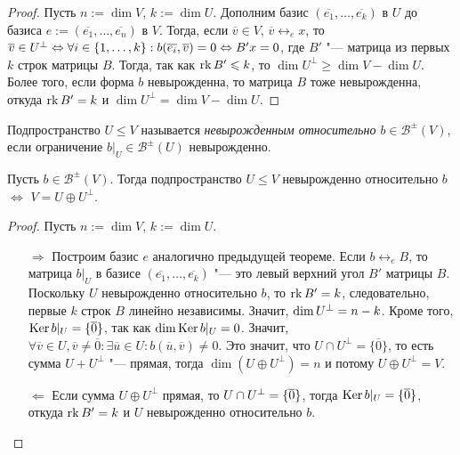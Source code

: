 \begin{proof}
	Пусть $n := \dim{V}$, $k := \dim{U}$. Дополним базис $(\overline{e_1}, \dots, \overline{e_k})$ в $U$ до базиса $e := (\overline{e_1}, \dots, \overline{e_n})$ в $V$. Тогда, если $\overline{v} \in V$, $\overline{v} \leftrightarrow_e x$, то $\overline{v} \in U^\perp \hm\Leftrightarrow \forall i \in \{1, \dots, k\}: b(\overline{e_i}, \overline{v}) \hm{=} 0 \Leftrightarrow B'x = 0$, где $B'$ "--- матрица из первых $k$ строк матрицы $B$. Тогда, так как $\operatorname{rk}{B'} \leqslant k$, то $\dim{U^\perp} \ge \dim{V} - \dim{U}$. Более того, если форма $b$ невырожденна, то матрица $B$ тоже невырожденна, откуда $\operatorname{rk}{B'} = k$ и $\dim{U^\perp} = \dim{V} - \dim{U}$.
\end{proof}

\begin{definition}
	Подпространство $U \le V$ называется \textit{невырожденным относительно $b\in \mathcal{B}^{\pm}(V)$}, если ограничение $b|_U \in \mathcal{B}^{\pm}(U)$ невырожденно.
\end{definition}

\begin{theorem}
	Пусть $b \in \mathcal{B}^{\pm}(V)$. Тогда подпространство $U \le V$ невырожденно относительно $b$ $\Leftrightarrow$ $V = U \oplus U^{\perp}$.
\end{theorem}

\begin{proof} Пусть $n := \dim{V}$, $k := \dim{U}$.
	\begin{itemize}
		\item[$\Rightarrow$] Построим базис $e$ аналогично предыдущей теореме. Если $b \leftrightarrow_e B$, то матрица $b|_U$ в базисе $(\overline{e_1}, \dots, \overline{e_k})$ "--- это левый верхний угол $B'$ матрицы $B$. Поскольку $U$ невырожденно относительно $b$, то $\operatorname{rk}{B'} = k$, следовательно, первые $k$ строк $B$ линейно независимы. Значит, $\dim{U^{\perp}} \hm{=} n - k$. Кроме того, $\operatorname{Ker}{b|_U} = \{\overline{0}\}$, так как $\dim{\operatorname{Ker}{b|_U}} = 0$. Значит, $\forall \overline{v} \in U, \overline{v} \ne \overline{0}: \exists \overline{u} \in U: b(\overline{u}, \overline{v}) \ne 0$. Это значит, что $U \cap U^{\perp} = \{\overline{0}\}$, то есть сумма $U + U^{\perp}$ "--- прямая, тогда $\dim(U \oplus U^\perp) = n$ и потому $U \oplus U^{\perp} = V$.
		
		\item[$\Leftarrow$] Если сумма $U \oplus U^{\perp}$ прямая, то $U \cap U^{\perp} \hm{=} \{\overline{0}\}$, тогда $\ke{b|_U} \hm{=} \{\overline{0}\}$, откуда $\operatorname{rk}{B'} = k$ и $U$ невырожденно относительно $b$.\qedhere
	\end{itemize}
\end{proof}

